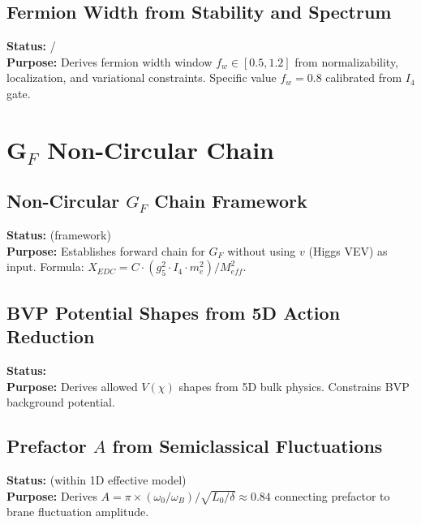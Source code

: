 

\subsection*{Fermion Width from Stability and Spectrum}
\textbf{Status:} \tagDc{}/\tagCal{} \\
\textbf{Purpose:} Derives fermion width window $f_w \in [0.5, 1.2]$ from
normalizability, localization, and variational constraints. Specific value
$f_w = 0.8$ calibrated from $I_4$ gate.



\section*{G$_F$ Non-Circular Chain}

\subsection*{Non-Circular $G_F$ Chain Framework}
\textbf{Status:} \tagDer{} (framework) \\
\textbf{Purpose:} Establishes forward chain for $G_F$ without using $v$
(Higgs VEV) as input. Formula: $X_{EDC} = C \cdot (g_5^2 \cdot I_4 \cdot m_e^2) / M_{eff}^2$.



\subsection*{BVP Potential Shapes from 5D Action Reduction}
\textbf{Status:} \tagDc{} \\
\textbf{Purpose:} Derives allowed $V(\chi)$ shapes from 5D bulk physics.
Constrains BVP background potential.



\subsection*{Prefactor $A$ from Semiclassical Fluctuations}
\textbf{Status:} \tagDer{} (within 1D effective model) \\
\textbf{Purpose:} Derives $A = \pi \times (\omega_0/\omega_B) / \sqrt{L_0/\delta} \approx 0.84$
connecting prefactor to brane fluctuation amplitude.

